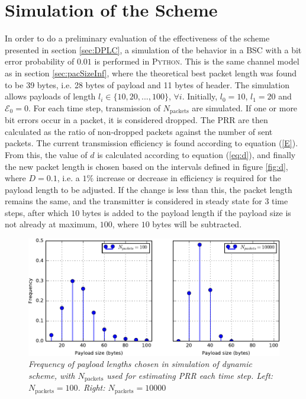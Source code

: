 \section{Simulation of the Scheme\label{sec:simScheme}}
In order to do a preliminary evaluation of the effectiveness of the scheme presented in section \ref{sec:DPLC}, a simulation of the behavior in a BSC with a bit error probability of $0.01$ is performed in \textsc{Python}. This is the same channel model as in section \ref{sec:pacSizeInf}, where the theoretical best packet length was found to be 39 bytes, i.e. 28 bytes of payload and 11 bytes of header. 
The simulation allows payloads of length $l_i \in \{10, 20, ... , 100\}$, $\forall i$. Initially, $l_0 = 10$, $l_1 = 20$ and $\mathcal{E}_0 = 0$. For each time step, transmission of $N_{\text{packets}}$ are simulated. If one or more bit errors occur in a packet, it is considered dropped. The PRR are then calculated as the ratio of non-dropped packets against the number of sent packets. The current transmission efficiency is found according to equation (\ref{E}). From this, the value of $d$ is calculated according to equation (\ref{eq:d}), and finally the new packet length is chosen based on the intervals defined in figure \ref{fig:d}, where $D=0.1$, i.e. a $1 \%$ increase or decrease in efficiency is required for the payload length to be adjusted. If the change is less than this, the packet length remains the same, and the transmitter is considered in steady state for $3$ time steps, after which $10$ bytes is added to the payload length if the payload size is not already at maximum, $100$, where $10$ bytes will be subtracted.
\\[8pt]
\begin{figure}
\centering
\includegraphics[scale=1]{figs/DPLCsim.pdf} 
\caption{\textit{Frequency of payload lengths chosen in simulation of dynamic scheme, with $N_{\text{packets}}$ used for estimating PRR each time step.
Left: $N_{\text{packets}}=100$. Right: $N_{\text{packets}} = 10000$}\label{fig:DPLCsim}}
\end{figure}
